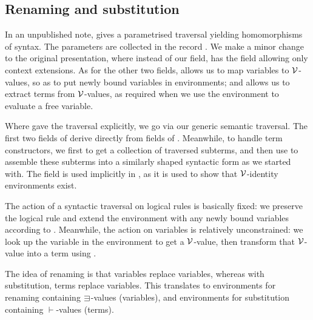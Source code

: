 \subsection{Renaming and substitution}\label{sec:kits}

In an unpublished note, \citet{McBride05} gives a parametrised traversal
yielding homomorphisms of syntax.
The parameters are collected in the record .
We make a minor change to the original presentation, where instead of our
 field, \citeauthor{McBride05} has the
field  allowing only context extensions.
As for the other two fields,  allows us to map variables to
$\mathcal V$-values, so as to put newly bound variables in environments; and
 allows us to extract terms from $\mathcal V$-values, as required when
we use the environment to evaluate a free variable.


Where \citeauthor{McBride05} gave the traversal explicitly, we go via our
generic semantic traversal.
The first two fields of  derive directly from fields of
.
Meanwhile, to handle term constructors, we first  to get a
collection of traversed subterms, and then use 
to assemble these subterms into a similarly shaped syntactic form as we started
with.
The  field is used implicitly in , as it is
used to show that $\mathcal V$-identity environments exist.


The action of a syntactic traversal on logical rules is basically fixed: we
preserve the logical rule and extend the environment with any newly bound
variables according to .
Meanwhile, the action on variables is relatively unconstrained: we look up the
variable in the environment to get a $\mathcal V$-value, then transform that $\mathcal V$-value
into a term using .

The idea of renaming is that variables replace variables, whereas with
substitution, terms replace variables.
This translates to environments for renaming containing $\sqni$-values
(variables), and environments for substitution containing $\vdash$-values
(terms).



